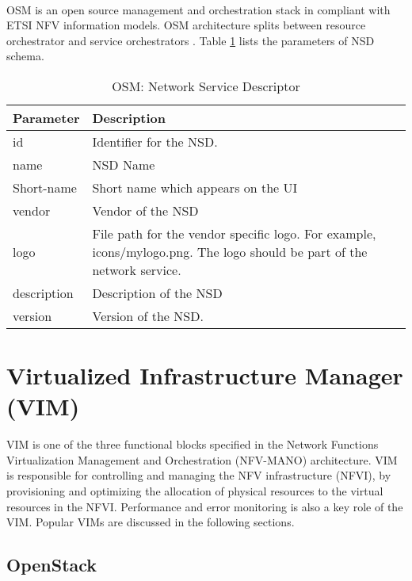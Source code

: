 \paragraph{}
OSM is an open source management and orchestration stack in compliant with ETSI NFV information models. OSM architecture splits between resource orchestrator and service orchestrators \cite{de2018network}. Table \ref{tab:OSM_nsd} lists the parameters of NSD schema. \cite{OSMSchemaDocumentation}
    \begin{table}[h]
        \centering
    \begin{tabular}{ |p{4cm}|p{10cm}|}
        \hline
        \textbf{Parameter} & \textbf{Description} \\
        \hline
         
         id &	Identifier for the NSD. \\
         \hline
         name &	NSD Name \\
         \hline
         Short-name &	Short name which appears on the UI \\
         \hline
         vendor &	Vendor of the NSD \\
         \hline
         logo &	File path for the vendor specific logo. For example, icons/mylogo.png. The logo should be part of the network service. \\
         \hline
         description &	Description of the NSD \\
         \hline
         version &	Version of the NSD. \\
         \hline
    \end{tabular}
        \caption{OSM: Network Service Descriptor}
    \label{tab:OSM_nsd}
 \end{table}


\section{Virtualized Infrastructure Manager (VIM)}

VIM is one of the three functional blocks specified in the Network Functions Virtualization Management and Orchestration (NFV-MANO) architecture. VIM is responsible for controlling and managing the NFV infrastructure (NFVI), by provisioning and optimizing the allocation of physical resources to the virtual resources in the NFVI. Performance and error monitoring is also a key role of the VIM. Popular VIMs are discussed in the following sections.


\subsection{OpenStack}


